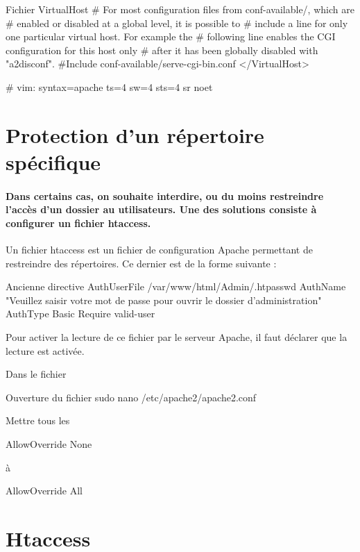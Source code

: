{\begin{Bash}{Fichier VirtualHost}
        # For most configuration files from conf-available/, which are
        # enabled or disabled at a global level, it is possible to
        # include a line for only one particular virtual host. For example the
        # following line enables the CGI configuration for this host only
        # after it has been globally disabled with "a2disconf".
        #Include conf-available/serve-cgi-bin.conf
</VirtualHost>

# vim: syntax=apache ts=4 sw=4 sts=4 sr noet

\end{Bash}


\section{Protection d’un répertoire spécifique}

\paragraph{
Dans certains cas, on souhaite interdire, ou du moins restreindre l’accès d’un dossier au utilisateurs.
Une des solutions consiste à configurer un fichier htaccess. \newline
}
Un fichier htaccess est un fichier de configuration Apache permettant de restreindre des répertoires.
Ce dernier est de la forme suivante : \newline 


\begin{Bash}{Ancienne directive}
AuthUserFile /var/www/html/Admin/.htpasswd
AuthName "Veuillez saisir votre mot de passe pour ouvrir le dossier d'administration"
AuthType Basic
Require valid-user
\end{Bash}

Pour activer la lecture de ce fichier par le serveur Apache, il faut déclarer que la lecture est activée.

Dans le fichier 
\begin{Bash}{Ouverture du fichier}
sudo nano /etc/apache2/apache2.conf
\end{Bash}

Mettre tous les 
\begin{Bash}{\protect }
AllowOverride None
\end{Bash}
à 
\begin{Bash}{\protect }
AllowOverride All
\end{Bash}


\section{Htaccess}

}
